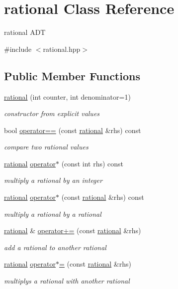 \hypertarget{classrational}{}\section{rational Class Reference}
\label{classrational}


rational A\+DT  




{\ttfamily \#include $<$rational.\+hpp$>$}

\subsection*{Public Member Functions}
\begin{DoxyCompactItemize}
\item 
\hyperlink{classrational_a5f971ef33181044f54d8e4fee71cb957}{rational} (int counter, int denominator=1)
\begin{DoxyCompactList}\small\item\em constructor from explicit values \end{DoxyCompactList}\item 
bool \hyperlink{classrational_a8b565720ea15ddfb17ea202e27698478}{operator==} (const \hyperlink{classrational}{rational} \&rhs) const
\begin{DoxyCompactList}\small\item\em compare two rational values \end{DoxyCompactList}\item 
\hyperlink{classrational}{rational} \hyperlink{classrational_a9c0f08f8be5db907dc6d93ad3f5cb26b}{operator$\ast$} (const int rhs) const
\begin{DoxyCompactList}\small\item\em multiply a rational by an integer \end{DoxyCompactList}\item 
\hyperlink{classrational}{rational} \hyperlink{classrational_a1dd39ab2daf08ee68087fdbb37be258e}{operator$\ast$} (const \hyperlink{classrational}{rational} \&rhs) const
\begin{DoxyCompactList}\small\item\em multiply a rational by a rational \end{DoxyCompactList}\item 
\hyperlink{classrational}{rational} \& \hyperlink{classrational_a9b83ad0c803d2ac242b42e71d954a356}{operator+=} (const \hyperlink{classrational}{rational} \&rhs)
\begin{DoxyCompactList}\small\item\em add a rational to another rational \end{DoxyCompactList}\item 
\hyperlink{classrational}{rational} \hyperlink{classrational_a2b5729aef261d16cd18ff7c7fcbf8c6e}{operator$\ast$=} (const \hyperlink{classrational}{rational} \&rhs)
\begin{DoxyCompactList}\small\item\em multiplys a rational with another rational \end{DoxyCompactList}\end{DoxyCompactItemize}
